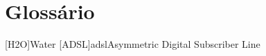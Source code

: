 \chapter{Glossário}

\footnotesize
\SingleSpacing

\begin{multicols}{2}
\begin{acronym}[AAAAAA]

	[H2O]{Water}
	[ADSL]{adsl}{Asymmetric Digital Subscriber Line}


\end{acronym}
\end{multicols}

